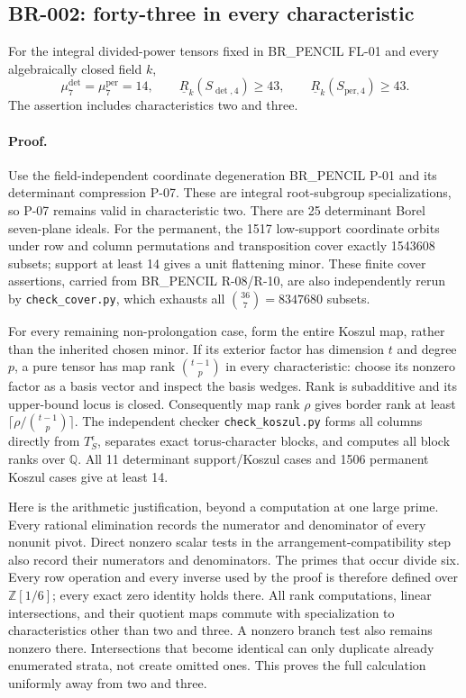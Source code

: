 \subsection*{BR-002: forty-three in every characteristic}
For the integral divided-power tensors fixed in BR\_PENCIL FL-01 and every
algebraically closed field $k$,
\[
 \mu_7^{\det}=\mu_7^{\mathrm{per}}=14,
 \qquad
 \underline R_k(S_{\det,4})\ge43,
 \qquad
 \underline R_k(S_{\mathrm{per},4})\ge43.
\]
The assertion includes characteristics two and three.

\paragraph{Proof.}
Use the field-independent coordinate degeneration BR\_PENCIL P-01 and
its determinant compression P-07.  These are integral root-subgroup
specializations, so P-07 remains valid in characteristic two.  There are
25 determinant Borel seven-plane ideals.  For the permanent, the 1517
low-support coordinate orbits under row and column permutations and
transposition cover exactly 1543608 subsets; support at least 14 gives
a unit flattening minor.  These finite cover assertions, carried from
BR\_PENCIL R-08/R-10, are also independently rerun by
\texttt{check\_cover.py}, which exhausts all $\binom{36}{7}=8347680$ subsets.

For every remaining non-prolongation case, form the entire Koszul map,
rather than the inherited chosen minor.  If its exterior factor has dimension
$t$ and degree $p$, a pure tensor has map rank $\binom{t-1}{p}$ in every
characteristic: choose its nonzero factor as a basis vector and inspect the
basis wedges.  Rank is subadditive and its upper-bound locus is closed.
Consequently map rank $\rho$ gives border rank at least
$\lceil\rho/\binom{t-1}{p}\rceil$.
The independent checker \texttt{check\_koszul.py} forms all columns directly
from $T_S^\epsilon$, separates exact torus-character blocks, and computes
all block ranks over $\mathbb Q$.  All 11 determinant support/Koszul cases
and 1506 permanent Koszul cases give at least 14.

Here is the arithmetic justification, beyond a computation at one large prime.
Every rational elimination records the numerator and denominator of every
nonunit pivot.  Direct nonzero scalar tests in the arrangement-compatibility
step also record their numerators and denominators.  The primes that occur
divide six.  Every row operation and every inverse used by the proof is
therefore defined over $\mathbb Z[1/6]$; every exact zero identity holds there.
All rank computations, linear intersections, and their quotient maps commute
with specialization to characteristics other than two and three.  A nonzero
branch test also remains nonzero there.  Intersections that become identical
can only duplicate already enumerated strata, not create omitted ones.
This proves the full calculation uniformly away from two and three.

